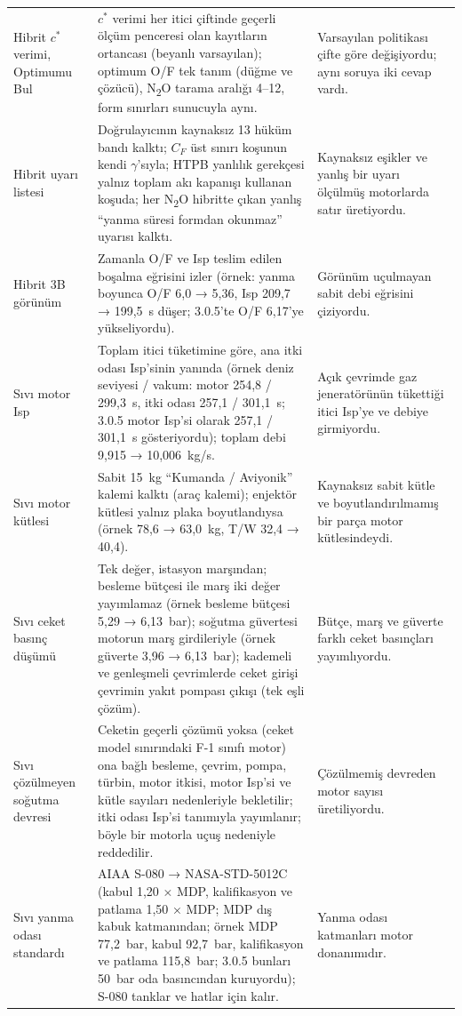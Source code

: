 \documentclass[11pt,a4paper]{article}
\begin{document}
\begin{longtable}{@{}>{\raggedright\arraybackslash}p{3.0cm}>{\raggedright\arraybackslash}p{8.0cm}>{\raggedright\arraybackslash}p{4.6cm}@{}}
Hibrit $c^*$ verimi, Optimumu Bul & $c^*$ verimi her itici çiftinde geçerli ölçüm penceresi olan kayıtların ortancası (beyanlı varsayılan); optimum O/F tek tanım (düğme ve çözücü), N\textsubscript{2}O tarama aralığı 4--12, form sınırları sunucuyla aynı. & Varsayılan politikası çifte göre değişiyordu; aynı soruya iki cevap vardı. \\
Hibrit uyarı listesi & Doğrulayıcının kaynaksız 13 hüküm bandı kalktı; $C_F$ üst sınırı koşunun kendi $\gamma$'sıyla; HTPB yanlılık gerekçesi yalnız toplam akı kapanışı kullanan koşuda; her N\textsubscript{2}O hibritte çıkan yanlış ``yanma süresi formdan okunmaz'' uyarısı kalktı. & Kaynaksız eşikler ve yanlış bir uyarı ölçülmüş motorlarda satır üretiyordu. \\
Hibrit 3B görünüm & Zamanla O/F ve Isp teslim edilen boşalma eğrisini izler (örnek: yanma boyunca O/F 6,0 → 5,36, Isp 209,7 → 199,5~s düşer; 3.0.5'te O/F 6,17'ye yükseliyordu). & Görünüm uçulmayan sabit debi eğrisini çiziyordu. \\
Sıvı motor Isp & Toplam itici tüketimine göre, ana itki odası Isp'sinin yanında (örnek deniz seviyesi / vakum: motor 254,8 / 299,3~s, itki odası 257,1 / 301,1~s; 3.0.5 motor Isp'si olarak 257,1 / 301,1~s gösteriyordu); toplam debi 9,915 → 10,006~kg/s. & Açık çevrimde gaz jeneratörünün tükettiği itici Isp'ye ve debiye girmiyordu. \\
Sıvı motor kütlesi & Sabit 15~kg ``Kumanda / Aviyonik'' kalemi kalktı (araç kalemi); enjektör kütlesi yalnız plaka boyutlandıysa (örnek 78,6 → 63,0~kg, T/W 32,4 → 40,4). & Kaynaksız sabit kütle ve boyutlandırılmamış bir parça motor kütlesindeydi. \\
Sıvı ceket basınç düşümü & Tek değer, istasyon marşından; besleme bütçesi ile marş iki değer yayımlamaz (örnek besleme bütçesi 5,29 → 6,13~bar); soğutma güvertesi motorun marş girdileriyle (örnek güverte 3,96 → 6,13~bar); kademeli ve genleşmeli çevrimlerde ceket girişi çevrimin yakıt pompası çıkışı (tek eşli çözüm). & Bütçe, marş ve güverte farklı ceket basınçları yayımlıyordu. \\
Sıvı çözülmeyen soğutma devresi & Ceketin geçerli çözümü yoksa (ceket model sınırındaki F-1 sınıfı motor) ona bağlı besleme, çevrim, pompa, türbin, motor itkisi, motor Isp'si ve kütle sayıları nedenleriyle bekletilir; itki odası Isp'si tanımıyla yayımlanır; böyle bir motorla uçuş nedeniyle reddedilir. & Çözülmemiş devreden motor sayısı üretiliyordu. \\
Sıvı yanma odası standardı & AIAA S-080 → NASA-STD-5012C (kabul 1,20 × MDP, kalifikasyon ve patlama 1,50 × MDP; MDP dış kabuk katmanından; örnek MDP 77,2~bar, kabul 92,7~bar, kalifikasyon ve patlama 115,8~bar; 3.0.5 bunları 50~bar oda basıncından kuruyordu); S-080 tanklar ve hatlar için kalır. & Yanma odası katmanları motor donanımıdır. \\

\end{longtable}
\end{document}
